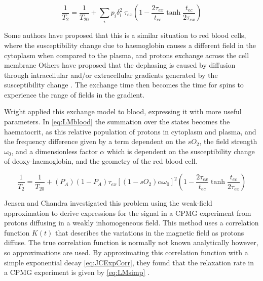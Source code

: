 \begin{equation}
\label{eq:LMchemEx}
\frac{1}{T_2} = \frac{1}{T_{20}} + \sum_i{p_i\delta_i^2}  \: \tau_{ex} \left(1 - \frac{2\tau_{ex}}{t_{ec}} \tanh{ \frac{t_{ec}}{2\tau_{ex}}}\right)
\end{equation}

Some authors have proposed that this is a similar situation to red blood cells, where the susceptibility change due to haemoglobin causes a different \Bzero field in the cytoplasm when compared to the plasma, and protons exchange across the cell membrane\cite{BryantMagneticrelaxationblood1990}
Others have proposed that the dephasing is caused by diffusion through intracellular and/or extracellular gradients generated by the susceptibility change \cite{GomoriNMRRelaxationTimes1987,BrooksComparisont2relaxation1995,BrooksT2shorteningweaklymagnetized2001}.
The exchange time then becomes the time for spins to experience the range of fields in the gradient.

Wright\cite{WrightEstimatingoxygensaturation1991} applied this exchange model to blood, expressing it with more useful parameters.
In \autoref{eq:LMblood} the summation over the states becomes the haematocrit, as this relative population of protons in cytoplasm and plasma, and the frequency difference given by a term dependent on the $sO_2$, the field strength $\omega_0$, and a dimensionless factor $\alpha$ which is dependent on the susceptibility change of deoxy-haemoglobin, and the geometry of the red blood cell.

\begin{equation}
\label{eq:LMblood}
\frac{1}{T_2} = \frac{1}{T_{20}} + (P_A)(1 - P_A)\tau_{ex} \left[(1-sO_2)\alpha\omega_0\right]^2 \left(1 - \frac{2\tau_{ex}}{t_{ec}} \tanh{\frac{t_{ec}}{2\tau_{ex}} } \right)
\end{equation}

Jensen and Chandra investigated this problem using the weak-field approximation to derive expressions for the signal in a CPMG experiment from protons diffusing in a weakly inhomogeneous field\cite{JensenNMRrelaxationtissues2000}.
This method uses a correlation function $K(t)$ that describes the variations in the magnetic field as protons diffuse.
The true correlation function is normally not known analytically however, so approximations are used.
By approximating this correlation function with a simple exponential decay \autoref{eq:JCExpCorr}, they found that the relaxation rate in a CPMG experiment is given by \autoref{eq:LMsimp} \cite{JensenNMRrelaxationtissues2000}.

